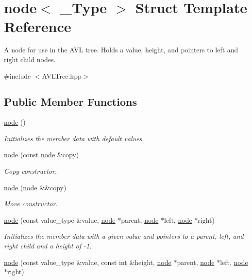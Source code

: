\hypertarget{structnode}{}\section{node$<$ \+\_\+\+Type $>$ Struct Template Reference}
\label{structnode}


A node for use in the A\+V\+L tree. Holds a value, height, and pointers to left and right child nodes.  




{\ttfamily \#include $<$A\+V\+L\+Tree.\+hpp$>$}

\subsection*{Public Member Functions}
\begin{DoxyCompactItemize}
\item 
\hyperlink{structnode_a07f56d66b295e3a51cd8e5771c505e2f}{node} ()
\begin{DoxyCompactList}\small\item\em Initializes the member data with default values. \end{DoxyCompactList}\item 
\hyperlink{structnode_a57d8701648d6e65867648f077add339b}{node} (const \hyperlink{structnode}{node} \&copy)
\begin{DoxyCompactList}\small\item\em Copy constructor. \end{DoxyCompactList}\item 
\hyperlink{structnode_ac422b5fa2f7dc1bfc6485373f4a37cf8}{node} (\hyperlink{structnode}{node} \&\&copy)
\begin{DoxyCompactList}\small\item\em Move constructor. \end{DoxyCompactList}\item 
\hyperlink{structnode_a48762381e551e35cb9ee0d515339dab0}{node} (const value\+\_\+type \&value, \hyperlink{structnode}{node} $\ast$parent, \hyperlink{structnode}{node} $\ast$left, \hyperlink{structnode}{node} $\ast$right)
\begin{DoxyCompactList}\small\item\em Initializes the member data with a given value and pointers to a parent, left, and right child and a height of -\/1. \end{DoxyCompactList}\item 
\hyperlink{structnode_a7eb8c2ea4c2dfeb90bef1ecee16aa0f9}{node} (const value\+\_\+type \&value, const int \&height, \hyperlink{structnode}{node} $\ast$parent, \hyperlink{structnode}{node} $\ast$left, \hyperlink{structnode}{node} $\ast$right)

\end{DoxyCompactItemize}
